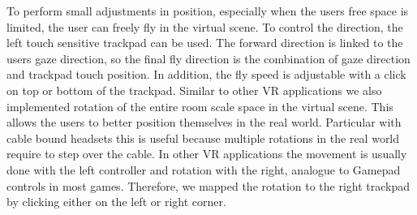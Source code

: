 To perform small adjustments in position, especially when the users free space is limited, the user can freely fly in the virtual scene. To control the direction, the left touch sensitive trackpad can be used. 
The forward direction is linked to the users gaze direction, so the final fly direction is the combination of gaze direction and trackpad touch position. 
In addition, the fly speed is adjustable with a click on top or bottom of the trackpad.    
Similar to other VR applications we also implemented rotation of the entire room scale space in the virtual scene. This allows the users to better position themselves in the real world. 
Particular with cable bound headsets this is useful because multiple rotations in the real world require to step over the cable. In other VR applications the movement is usually done with the left controller and rotation with the right, analogue to Gamepad controls in most games. Therefore, we mapped the rotation to the right trackpad by clicking either on the left or right corner.


